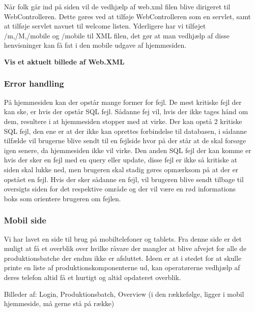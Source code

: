 \documentclass[a4paper]{article}
\begin{document}
Når folk går ind på siden vil de vedhjælp af web.xml filen blive dirigeret til WebControlleren. Dette gøres ved at tilføje WebControlleren som en servlet, samt at tilføje servlet navnet til welcome listen. Yderligere har vi tilføjet /m,/M,/mobile og /mobile til XML filen, det gør at man vedhjælp af disse henvisninger kan få fat i den mobile udgave af hjemmesiden.

\textbf{Vis et aktuelt billede af Web.XML}


\subsubsection{Error handling} %

På hjemmesiden kan der opstår mange former for fejl. De mest kritiske fejl der kan ske, er hvis der opstår SQL fejl. Sådanne fej vil, hvis der ikke tages hånd om dem, resultere i at hjemmesiden stopper med at virke. Der kan opstå 2 kritiske SQL fejl, den ene er at der ikke kan oprettes forbindelse til databasen, i sådanne tilfælde vil brugerne blive sendt til en fejlside hvor på der står at de skal forsøge igen senere, da hjemmesiden ikke vil virke. Den anden SQL fejl der kan komme er hvis der sker en fejl med en query eller update, disse fejl er ikke så kritiske at siden skal lukke ned, men brugeren skal stadig gøres opmærksom på at der er opstået en fejl. Hvis der sker sådanne en fejl, vil brugeren blive sendt tilbage til oversigts siden for det respektive område og der vil være en rød informations boks som orientere brugeren om fejlen.


\subsubsection{Mobil side} %

Vi har lavet en side til brug på mobiltelefoner og tablets. Fra denne side er det muligt at få et overblik over hvilke råvare der mangler at blive afvejet for alle de produktionsbatche der endnu ikke er afsluttet. Ideen er at i stedet for at skulle printe en liste af produktionskomponenterne ud, kan operatørerne vedhjælp af deres telefon altid få et hurtigt og altid opdateret overblik. 

\begin{center}
  Billeder af: Login, Produktionsbatch, Overview (i den rækkefølge, ligger i mobil hjemmeside, må gerne stå på række)
\end{center}
\end{document}
